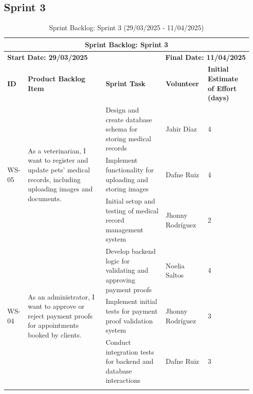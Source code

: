 \documentclass[a4paper,12pt]{report}
\begin{document}
	\subsection{Sprint 3}
	\begin{longtable}{|p{2cm}|p{4cm}|p{5cm}|p{3cm}|p{2cm}|} 
		\hline
		\multicolumn{5}{|c|}{\textbf{Sprint Backlog: Sprint 3}} \\
		\hline
		\multicolumn{2}{|l|}{\textbf{Start Date: 29/03/2025}} & \multicolumn{3}{r|}{\textbf{Final Date: 11/04/2025}} \\
		\hline
		\textbf{ID} & \textbf{Product Backlog Item} & \textbf{Sprint Task} & \textbf{Volunteer} & \textbf{Initial Estimate of Effort (days)} \\
		\hline
		\multirow{3}{*}{WS-05} 
		& \multirow{3}{4cm}{As a veterinarian, I want to register and update pets' medical records, including uploading images and documents.}
		& Design and create database schema for storing medical records & Jahir Díaz & 4 \\
		\cline{3-5}
		& & Implement functionality for uploading and storing images & Dafne Ruiz & 4 \\
		\cline{3-5}
		& & Initial setup and testing of medical record management system & Jhonny Rodríguez & 2 \\
		\hline
		\multirow{3}{*}{WS-04} 
		& \multirow{3}{4cm}{As an administrator, I want to approve or reject payment proofs for appointments booked by clients.}
		& Develop backend logic for validating and approving payment proofs & Noelia Saltos & 4 \\
		\cline{3-5}
		& & Implement initial tests for payment proof validation system & Jhonny Rodríguez & 3 \\
		\cline{3-5}
		& & Conduct integration tests for backend and database interactions & Dafne Ruiz & 3 \\
		\hline
		\caption{Sprint Backlog: Sprint 3 (29/03/2025 - 11/04/2025)}
	\end{longtable}
	
	
\end{document}
